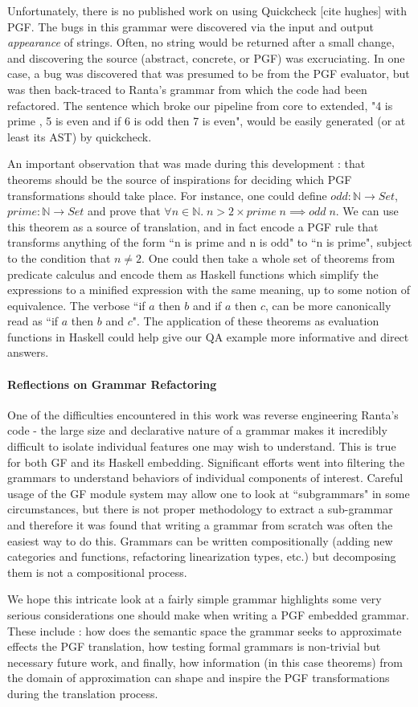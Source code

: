 Unfortunately, there is no published work on using Quickcheck [cite hughes] with
PGF. The bugs in this grammar were discovered via the input and output
\emph{appearance} of strings. Often, no string would be returned after a small
change, and discovering the source (abstract, concrete, or PGF) was
excruciating. In one case, a bug was discovered that was presumed to be from the
PGF evaluator, but was then back-traced to Ranta's grammar from which the code
had been refactored. The sentence which broke our pipeline from core to
extended, "4 is prime , 5 is even and if 6 is odd then 7 is even", would be
easily generated (or at least its AST) by quickcheck.

An important observation that was made during this development : that theorems
should be the source of inspirations for deciding which PGF transformations
should take place. For instance, one could define $odd : \mathds{N}
\rightarrow Set$, $prime : \mathds{N} \rightarrow Set$ and prove that $\forall n
\in \mathds{N}.\; n > 2 \times prime\; n \implies odd\; n$. We can use this
theorem as a source of translation, and in fact encode a PGF rule that
transforms anything of the form ``n is prime and n is odd" to ``n is prime",
subject to the condition that $n \neq 2$. One could then take a whole set of
theorems from predicate calculus and encode them as Haskell functions which
simplify the expressions to a minified expression with the
same meaning, up to some notion of equivalence. The verbose ``if $a$ then $b$
and if $a$ then $c$, can be more canonically read as ``if $a$ then $b$ and $c$".
The application of these theorems as evaluation functions in Haskell could
help give our QA example more informative and direct answers.

\paragraph{Reflections on Grammar Refactoring}
One of the difficulties encountered in this work was reverse engineering Ranta's
code - the large size and declarative nature of a grammar makes it incredibly
difficult to isolate individual features one may wish to understand. This is
true for both GF and its Haskell embedding. Significant efforts went into
filtering the grammars to understand behaviors of individual components of
interest. Careful usage of the GF module system may allow one to look at
``subgrammars" in some circumstances, but there is not proper methodology to
extract a sub-grammar and therefore it was found that writing a grammar from
scratch was often the easiest way to do this. Grammars can be written
compositionally (adding new categories and functions, refactoring linearization
types, etc.) but decomposing them is not a compositional process.

We hope this intricate look at a fairly simple grammar highlights some very
serious considerations one should make when writing a PGF embedded grammar.
These include : how does the semantic space the grammar seeks to approximate
effects the PGF translation, how testing formal grammars is non-trivial but
necessary future work, and finally, how information (in this case theorems) from
the domain of approximation can shape and inspire the PGF transformations 
during the translation process.
